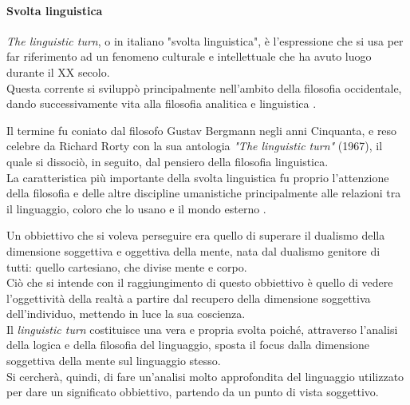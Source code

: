 \paragraph{Svolta linguistica}
\textit{The linguistic turn}, o in italiano "svolta linguistica", è l'espressione che si usa per far riferimento ad un fenomeno culturale e intellettuale che ha avuto luogo durante il XX secolo.\\
Questa corrente si sviluppò principalmente nell'ambito della filosofia occidentale, dando successivamente vita alla filosofia analitica e linguistica \parencite{Rorty_Linguistic_Turn}. 

Il termine fu coniato dal filosofo Gustav Bergmann negli anni Cinquanta, e reso celebre da Richard Rorty con la sua antologia \textit{"The linguistic turn"} (1967), il quale si dissociò, in seguito, dal pensiero della filosofia linguistica.\\
La caratteristica più importante della svolta linguistica fu proprio l'attenzione della filosofia e delle altre discipline umanistiche principalmente alle relazioni tra il linguaggio, coloro che lo usano e il mondo esterno \parencite{linguistic_turn}. 

Un obbiettivo che si voleva perseguire era quello di superare il dualismo della dimensione soggettiva e oggettiva della mente, nata dal dualismo genitore di tutti: quello cartesiano, che divise mente e corpo.\\
Ciò che si intende con il raggiungimento di questo obbiettivo è quello di vedere l'oggettività della realtà a partire dal recupero della dimensione soggettiva dell'individuo, mettendo in luce la sua coscienza.\\
Il \textit{linguistic turn} costituisce una vera e propria svolta poiché, attraverso l'analisi della logica e della filosofia del linguaggio, sposta il focus dalla dimensione soggettiva della mente sul linguaggio stesso.\\
Si cercherà, quindi, di fare un'analisi molto approfondita del linguaggio utilizzato per dare un significato obbiettivo, partendo da un punto di vista soggettivo. 


